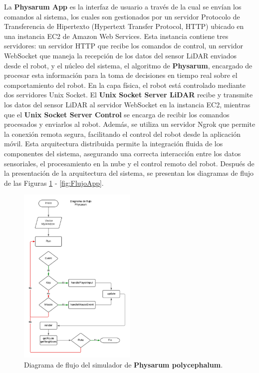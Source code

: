         \vskip 0.5cm
        La \textbf{Physarum App} es la interfaz de usuario a trav\'es de la cual se env\'ian los comandos al sistema, 
        los cuales son gestionados por un servidor Protocolo de Transferencia de Hipertexto (Hypertext Transfer Protocol, HTTP) ubicado en una instancia EC2 de Amazon Web Services. Esta instancia 
        contiene tres servidores: un servidor HTTP que recibe los comandos de control, un servidor WebSocket que maneja la 
        recepci\'on de los datos del sensor LiDAR enviados desde el robot, y el n\'ucleo del sistema, el algoritmo de \textbf{Physarum},
        encargado de procesar esta informaci\'on para la toma de decisiones en tiempo real sobre el comportamiento del robot.
        \vskip 0.5cm
        En la capa f\'isica, el robot est\'a controlado 
        mediante dos servidores Unix Socket. El \textbf{Unix Socket Server LiDAR} recibe 
        y transmite los datos del sensor LiDAR al servidor WebSocket en la instancia EC2, 
        mientras que el \textbf{Unix Socket Server Control} se encarga de recibir los comandos procesados y enviarlos al robot. 
        Adem\'as, se utiliza un servidor Ngrok que permite la conexi\'on remota segura, facilitando el control del robot desde 
        la aplicaci\'on m\'ovil.
        \vskip 0.5cm
        Esta arquitectura distribuida permite la integraci\'on fluida de los componentes del sistema, 
        asegurando una correcta interacci\'on entre los datos sensoriales, el procesamiento en la nube y el control 
        remoto del robot.
        \vskip 0.5cm
        Despu\'es de la presentaci\'on de la arquitectura del sistema, se presentan los diagramas de flujo de las Figuras
        \ref{fig:FlujoSimulador} - \ref{fig:FlujoApp}.
        \vskip 0.5cm
            \begin{figure}[htbp]
                \centering
                \includegraphics[width=0.5\textwidth]{images/desarrollo/diagramas/FlujoSim.png}
                \caption{Diagrama de flujo del simulador de \textbf{Physarum polycephalum}.}
                \label{fig:FlujoSimulador}
            \end{figure}
        \vskip 0.5cm

